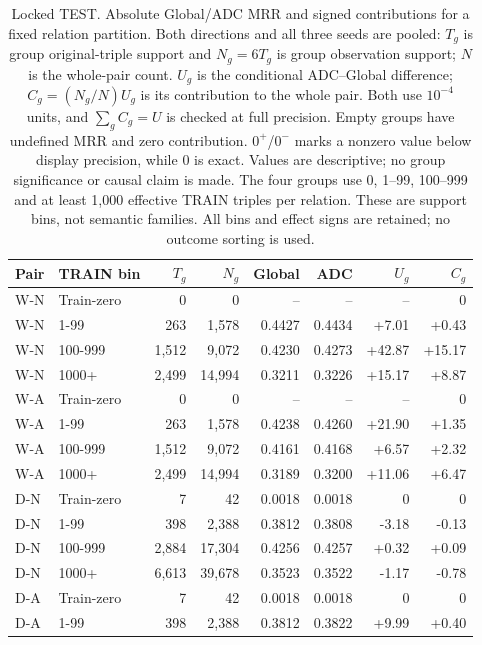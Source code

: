 \begin{table}[htbp]
\centering\footnotesize\setlength{\tabcolsep}{3pt}
\caption{Locked TEST. Absolute Global/ADC MRR and signed contributions for a fixed relation partition. Both directions and all three seeds are pooled: $T_g$ is group original-triple support and $N_g=6T_g$ is group observation support; $N$ is the whole-pair count. $U_g$ is the conditional ADC--Global difference; $C_g=(N_g/N)U_g$ is its contribution to the whole pair. Both use $10^{-4}$ units, and $\sum_g C_g=U$ is checked at full precision. Empty groups have undefined MRR and zero contribution. $0^{+}$/$0^{-}$ marks a nonzero value below display precision, while 0 is exact. Values are descriptive; no group significance or causal claim is made. The four groups use 0, 1--99, 100--999 and at least 1,000 effective TRAIN triples per relation. These are support bins, not semantic families. All bins and effect signs are retained; no outcome sorting is used.}
\label{tab:group-frequency_test}
\begin{tabular}{llrrrrrr}
\toprule
Pair & TRAIN bin & $T_g$ & $N_g$ & Global & ADC & $U_g$ & $C_g$\\
\midrule
W-N & Train-zero & 0 & 0 & -- & -- & -- & 0\\
W-N & 1-99 & 263 & 1,578 & 0.4427 & 0.4434 & +7.01 & +0.43\\
W-N & 100-999 & 1,512 & 9,072 & 0.4230 & 0.4273 & +42.87 & +15.17\\
W-N & 1000+ & 2,499 & 14,994 & 0.3211 & 0.3226 & +15.17 & +8.87\\
W-A & Train-zero & 0 & 0 & -- & -- & -- & 0\\
W-A & 1-99 & 263 & 1,578 & 0.4238 & 0.4260 & +21.90 & +1.35\\
W-A & 100-999 & 1,512 & 9,072 & 0.4161 & 0.4168 & +6.57 & +2.32\\
W-A & 1000+ & 2,499 & 14,994 & 0.3189 & 0.3200 & +11.06 & +6.47\\
D-N & Train-zero & 7 & 42 & 0.0018 & 0.0018 & 0 & 0\\
D-N & 1-99 & 398 & 2,388 & 0.3812 & 0.3808 & -3.18 & -0.13\\
D-N & 100-999 & 2,884 & 17,304 & 0.4256 & 0.4257 & +0.32 & +0.09\\
D-N & 1000+ & 6,613 & 39,678 & 0.3523 & 0.3522 & -1.17 & -0.78\\
D-A & Train-zero & 7 & 42 & 0.0018 & 0.0018 & 0 & 0\\
D-A & 1-99 & 398 & 2,388 & 0.3812 & 0.3822 & +9.99 & +0.40\\

\end{tabular}
\end{table}
